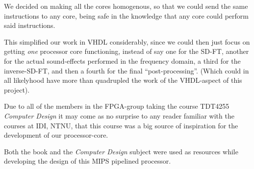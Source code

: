 We decided on making all the cores homogenous, so that we could send the same
instructions to any core, being safe in the knowledge that any core could
perform said instructions.

This simplified our work in VHDL considerably, since we could then just focus on
getting \emph{one} processor core functioning, instead of say one for the SD-FT,
another for the actual sound-effects performed in the frequency domain, a third
for the inverse-SD-FT, and then a fourth for the final ``post-processing''.
(Which could in all likelyhood have more than quadrupled the work of the
VHDL-aspect of this project).

Due to all of the members in the FPGA-group taking the course TDT4255 \emph{
Computer Design} it may come as no surprise to any reader familiar with the
courses at IDI, NTNU, that this course was a big source of inspiration for the
development of our processor-core.

Both the book\cite{tdt4255-book} and the \emph{Computer Design} subject were
used as resources while developing the design of this MIPS pipelined processor.
